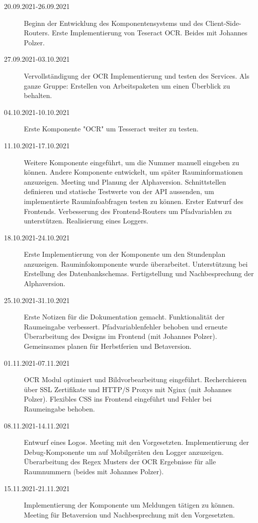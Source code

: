 
\begin{description}
    \item[20.09.2021-26.09.2021]Beginn der Entwicklung des Komponentensystems und des Client-Side-Routers. Erste Implementierung von Teseract OCR. Beides mit Johannes Polzer.
    \item[27.09.2021-03.10.2021] Vervollständigung der OCR Implementierung und testen des Services. Als ganze Gruppe: Erstellen von Arbeitspaketen um einen Überblick zu behalten.
    \item[04.10.2021-10.10.2021] Erste Komponente "OCR" um Tesseract weiter zu testen.
    \item[11.10.2021-17.10.2021] Weitere Komponente eingeführt, um die Nummer manuell eingeben zu können. Andere Komponente entwickelt, um später Rauminformationen anzuzeigen. Meeting und Planung der Alphaversion. Schnittstellen definieren und statische Testwerte von der API aussenden, um implementierte Rauminfoabfragen testen zu können. Erster Entwurf des Frontends. Verbesserung des Frontend-Routers um Pfadvariablen zu unterstützen. Realisierung eines Loggers.
    \item[18.10.2021-24.10.2021] Erste Implementierung von der Komponente um den Stundenplan anzuzeigen. Rauminfokomponente wurde überarbeitet. Unterstützung bei Erstellung des Datenbankschemas. Fertigstellung und Nachbesprechung der Alphaversion.
    \item[25.10.2021-31.10.2021] Erste Notizen für die Dokumentation gemacht. Funktionalität der Raumeingabe verbessert. Pfadvariablenfehler behoben und erneute Überarbeitung des Designs im Frontend (mit Johannes Polzer). Gemeinsames planen für Herbstferien und Betaversion.
    \item[01.11.2021-07.11.2021] OCR Modul optimiert und Bildvorbearbeitung eingeführt. Recherchieren über SSL Zertifikate und HTTP/S Proxys mit Nginx (mit Johannes Polzer). Flexibles CSS ins Frontend eingeführt und Fehler bei Raumeingabe behoben.
    \item[08.11.2021-14.11.2021] Entwurf eines Logos. Meeting mit den Vorgesetzten. Implementierung der Debug-Komponente um auf Mobilgeräten den Logger anzuzeigen. Überarbeitung des Regex Musters der OCR Ergebnisse für alle Raumnummern (beides mit Johannes Polzer).
    \item[15.11.2021-21.11.2021] Implementierung der Komponente um Meldungen tätigen zu können. Meeting für Betaversion und Nachbesprechung mit den Vorgesetzten. 

\end{description}
